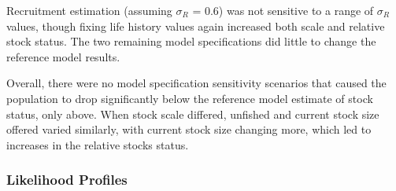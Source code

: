 \documentclass[11pt,
  english,
  a4paper,
]{article}
\begin{document}
\leavevmode\tagmcend\tagstructend\par


Recruitment estimation (assuming {\(\sigma_R\)\leavevmode\tagmcend\tagstructend} = 0.6) was not sensitive to a range of {\(\sigma_R\)\leavevmode\tagmcend\tagstructend} values, though fixing life history values again increased both scale and relative stock status. The two remaining model specifications did little to change the reference model results.

\leavevmode\tagmcend\tagstructend\par


Overall, there were no model specification sensitivity scenarios that caused the population to drop significantly below the reference model estimate of stock status, only above. When stock scale differed, unfished and current stock size offered varied similarly, with current stock size changing more, which led to increases in the relative stocks status.

\leavevmode\tagmcend\tagstructend\par


\hypertarget{likelihood-profiles}{%
\subsubsection{Likelihood Profiles}\label{likelihood-profiles}}

\leavevmode\tagmcend\tagstructend

\end{document}
